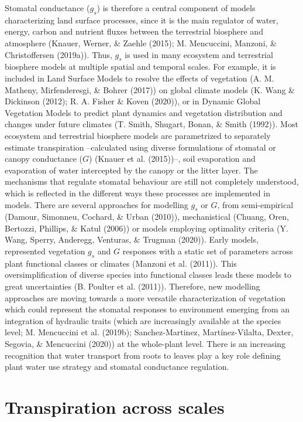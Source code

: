 \documentclass[11pt,twoside]{reedthesis}
\begin{document}
Stomatal conductance (\(g_s\)) is therefore a central component of
models characterizing land surface processes, since it is the main
regulator of water, energy, carbon and nutrient fluxes between the
terrestrial biosphere and atmosphere (Knauer, Werner, \& Zaehle (2015);
M. Mencuccini, Manzoni, \& Christoffersen (2019a)). Thus, \(g_s\) is
used in many ecosystem and terrestrial biosphere models at multiple
spatial and temporal scales. For example, it is included in Land Surface
Models to resolve the effects of vegetation (A. M. Matheny,
Mirfenderesgi, \& Bohrer (2017)) on global climate models (K. Wang \&
Dickinson (2012); R. A. Fisher \& Koven (2020)), or in Dynamic Global
Vegetation Models to predict plant dynamics and vegetation distribution
and changes under future climates (T. Smith, Shugart, Bonan, \& Smith
(1992)). Most ecosystem and terrestrial biosphere models are
parametrized to separately estimate transpiration --calculated using
diverse formulations of stomatal or canopy conductance (\(G\)) (Knauer
et al. (2015))--, soil evaporation and evaporation of water intercepted
by the canopy or the litter layer. The mechanisms that regulate stomatal
behaviour are still not completely understood, which is reflected in the
different ways these processes are implemented in models. There are
several approaches for modelling \(g_s\) or \(G\), from semi-empirical
(Damour, Simonneu, Cochard, \& Urban (2010)), mechanistical (Chuang,
Oren, Bertozzi, Phillips, \& Katul (2006)) or models employing
optimality criteria (Y. Wang, Sperry, Anderegg, Venturas, \& Trugman
(2020)). Early models, represented vegetation \(g_s\) and \(G\)
responses with a static set of parameters across plant functional
classes or climates (Manzoni et al. (2011)). This oversimplification of
diverse species into functional classes leads these models to great
uncertainties (B. Poulter et al. (2011)). Therefore, new modelling
approaches are moving towards a more versatile characterization of
vegetation which could represent the stomatal responses to environment
emerging from an integration of hydraulic traits (which are increasingly
available at the species level; M. Mencuccini et al. (2019b);
Sanchez-Martinez, Martínez-Vilalta, Dexter, Segovia, \& Mencuccini
(2020)) at the whole-plant level. There is an increasing recognition
that water transport from roots to leaves play a key role defining plant
water use strategy and stomatal conductance regulation.\par

\section{Transpiration across scales}\label{transpiration-across-scales}
\end{document}
